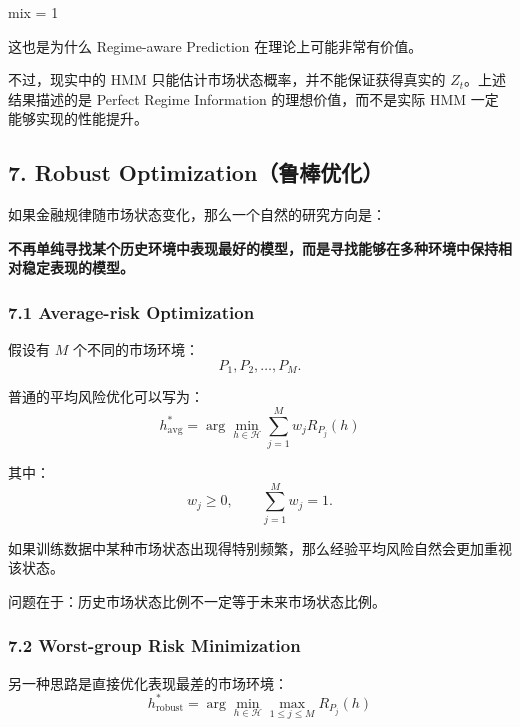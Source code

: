 
mix = 1


这也是为什么 Regime-aware Prediction 在理论上可能非常有价值。

不过，现实中的 HMM 只能估计市场状态概率，并不能保证获得真实的 \(Z_t\)。上述结果描述的是 Perfect Regime Information 的理想价值，而不是实际 HMM 一定能够实现的性能提升。

\hypertarget{part-4-77-0001-robust-optimizationux9c81ux68d2ux4f18ux5316}{%
\subsection{7. Robust Optimization（鲁棒优化）}\label{part-4-77-0001-robust-optimizationux9c81ux68d2ux4f18ux5316}}

如果金融规律随市场状态变化，那么一个自然的研究方向是：

\textbf{不再单纯寻找某个历史环境中表现最好的模型，而是寻找能够在多种环境中保持相对稳定表现的模型。}

\hypertarget{part-4-77-0001-average-risk-optimization}{%
\subsubsection{7.1 Average-risk Optimization}\label{part-4-77-0001-average-risk-optimization}}

假设有 \(M\) 个不同的市场环境：
\[P_1,P_2,\ldots,P_M.\]

普通的平均风险优化可以写为：
\[\boxed{
h_{\mathrm{avg}}^*
=
\arg\min_{h\in\mathcal H}
\sum_{j=1}^{M}w_jR_{P_j}(h)
}\]

其中：
\[w_j\geq0,\qquad
\sum_{j=1}^{M}w_j=1.\]

如果训练数据中某种市场状态出现得特别频繁，那么经验平均风险自然会更加重视该状态。

问题在于：历史市场状态比例不一定等于未来市场状态比例。

\hypertarget{part-4-77-0001-worst-group-risk-minimization}{%
\subsubsection{7.2 Worst-group Risk Minimization}\label{part-4-77-0001-worst-group-risk-minimization}}

另一种思路是直接优化表现最差的市场环境：
\[\boxed{
h_{\mathrm{robust}}^*
=
\arg\min_{h\in\mathcal H}
\max_{1\leq j\leq M}
R_{P_j}(h)
}\]

